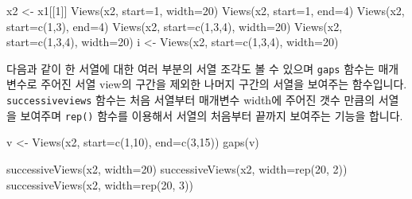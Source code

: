 \documentclass[
]{book}
\newenvironment{Shaded}{\begin{snugshade}}{\end{snugshade}}
\newcommand{\AttributeTok}[1]{\textcolor[rgb]{0.77,0.63,0.00}{#1}}
\newcommand{\DecValTok}[1]{\textcolor[rgb]{0.00,0.00,0.81}{#1}}
\newcommand{\FunctionTok}[1]{\textcolor[rgb]{0.00,0.00,0.00}{#1}}
\newcommand{\NormalTok}[1]{#1}
\newcommand{\OtherTok}[1]{\textcolor[rgb]{0.56,0.35,0.01}{#1}}
\begin{document}
\begin{Shaded}
\begin{Highlighting}[]
\NormalTok{x2 }\OtherTok{\textless{}{-}}\NormalTok{ x1[[}\DecValTok{1}\NormalTok{]]}
\FunctionTok{Views}\NormalTok{(x2, }\AttributeTok{start=}\DecValTok{1}\NormalTok{, }\AttributeTok{width=}\DecValTok{20}\NormalTok{)}
\FunctionTok{Views}\NormalTok{(x2, }\AttributeTok{start=}\DecValTok{1}\NormalTok{, }\AttributeTok{end=}\DecValTok{4}\NormalTok{)}
\FunctionTok{Views}\NormalTok{(x2, }\AttributeTok{start=}\FunctionTok{c}\NormalTok{(}\DecValTok{1}\NormalTok{,}\DecValTok{3}\NormalTok{), }\AttributeTok{end=}\DecValTok{4}\NormalTok{)}
\FunctionTok{Views}\NormalTok{(x2, }\AttributeTok{start=}\FunctionTok{c}\NormalTok{(}\DecValTok{1}\NormalTok{,}\DecValTok{3}\NormalTok{,}\DecValTok{4}\NormalTok{), }\AttributeTok{width=}\DecValTok{20}\NormalTok{)}
\FunctionTok{Views}\NormalTok{(x2, }\AttributeTok{start=}\FunctionTok{c}\NormalTok{(}\DecValTok{1}\NormalTok{,}\DecValTok{3}\NormalTok{,}\DecValTok{4}\NormalTok{), }\AttributeTok{width=}\DecValTok{20}\NormalTok{)}
\NormalTok{i }\OtherTok{\textless{}{-}} \FunctionTok{Views}\NormalTok{(x2, }\AttributeTok{start=}\FunctionTok{c}\NormalTok{(}\DecValTok{1}\NormalTok{,}\DecValTok{3}\NormalTok{,}\DecValTok{4}\NormalTok{), }\AttributeTok{width=}\DecValTok{20}\NormalTok{)}
\end{Highlighting}
\end{Shaded}

다음과 같이 한 서열에 대한 여러 부분의 서열 조각도 볼 수 있으며 \texttt{gaps} 함수는 매개변수로 주어진 서열 view의 구간을 제외한 나머지 구간의 서열을 보여주는 함수입니다. \texttt{successiveviews} 함수는 처음 서열부터 매개변수 width에 주어진 갯수 만큼의 서열을 보여주며 \texttt{rep()} 함수를 이용해서 서열의 처음부터 끝까지 보여주는 기능을 합니다.

\begin{Shaded}
\begin{Highlighting}[]
\NormalTok{v }\OtherTok{\textless{}{-}} \FunctionTok{Views}\NormalTok{(x2, }\AttributeTok{start=}\FunctionTok{c}\NormalTok{(}\DecValTok{1}\NormalTok{,}\DecValTok{10}\NormalTok{), }\AttributeTok{end=}\FunctionTok{c}\NormalTok{(}\DecValTok{3}\NormalTok{,}\DecValTok{15}\NormalTok{))}
\FunctionTok{gaps}\NormalTok{(v)}

\FunctionTok{successiveViews}\NormalTok{(x2, }\AttributeTok{width=}\DecValTok{20}\NormalTok{)}
\FunctionTok{successiveViews}\NormalTok{(x2, }\AttributeTok{width=}\FunctionTok{rep}\NormalTok{(}\DecValTok{20}\NormalTok{, }\DecValTok{2}\NormalTok{))}
\FunctionTok{successiveViews}\NormalTok{(x2, }\AttributeTok{width=}\FunctionTok{rep}\NormalTok{(}\DecValTok{20}\NormalTok{, }\DecValTok{3}\NormalTok{))}
\end{Highlighting}
\end{Shaded}
\end{document}
